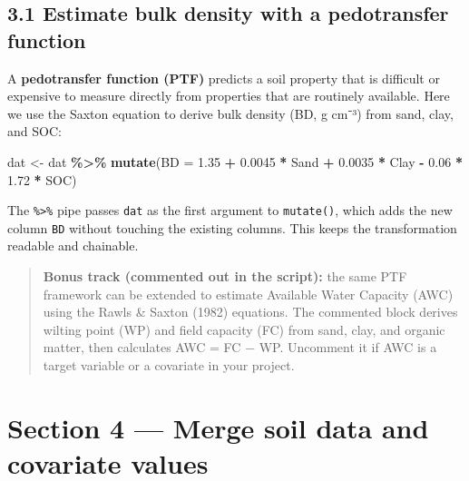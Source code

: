 \documentclass[
  10pt,
  b5paper,
  oneside]{book}
\newenvironment{Shaded}{\begin{snugshade}}{\end{snugshade}}
\newcommand{\AttributeTok}[1]{\textcolor[rgb]{0.13,0.29,0.53}{#1}}
\newcommand{\FloatTok}[1]{\textcolor[rgb]{0.00,0.00,0.81}{#1}}
\newcommand{\FunctionTok}[1]{\textcolor[rgb]{0.13,0.29,0.53}{\textbf{#1}}}
\newcommand{\NormalTok}[1]{#1}
\newcommand{\OtherTok}[1]{\textcolor[rgb]{0.56,0.35,0.01}{#1}}
\newcommand{\SpecialCharTok}[1]{\textcolor[rgb]{0.81,0.36,0.00}{\textbf{#1}}}
\begin{document}
\subsection*{3.1 Estimate bulk density with a pedotransfer function}\label{estimate-bulk-density-with-a-pedotransfer-function}

A \textbf{pedotransfer function (PTF)} predicts a soil property that is difficult or
expensive to measure directly from properties that are routinely available. Here we
use the Saxton equation to derive bulk density (BD, g cm⁻³) from sand, clay, and SOC:

\begin{Shaded}
\begin{Highlighting}[]
\NormalTok{dat }\OtherTok{\textless{}{-}}\NormalTok{ dat }\SpecialCharTok{\%\textgreater{}\%}
  \FunctionTok{mutate}\NormalTok{(}\AttributeTok{BD =} \FloatTok{1.35} \SpecialCharTok{+} \FloatTok{0.0045} \SpecialCharTok{*}\NormalTok{ Sand }\SpecialCharTok{+} \FloatTok{0.0035} \SpecialCharTok{*}\NormalTok{ Clay }\SpecialCharTok{{-}} \FloatTok{0.06} \SpecialCharTok{*} \FloatTok{1.72} \SpecialCharTok{*}\NormalTok{ SOC)}
\end{Highlighting}
\end{Shaded}

The \texttt{\%\textgreater{}\%} pipe passes \texttt{dat} as the first argument to \texttt{mutate()}, which adds the new
column \texttt{BD} without touching the existing columns. This keeps the transformation
readable and chainable.

\begin{quote}
\textbf{Bonus track (commented out in the script):} the same PTF framework can be
extended to estimate Available Water Capacity (AWC) using the Rawls \& Saxton (1982)
equations. The commented block derives wilting point (WP) and field capacity (FC)
from sand, clay, and organic matter, then calculates AWC = FC − WP. Uncomment it if
AWC is a target variable or a covariate in your project.
\end{quote}

\section*{Section 4 --- Merge soil data and covariate values}\label{section-4-merge-soil-data-and-covariate-values}
\end{document}
